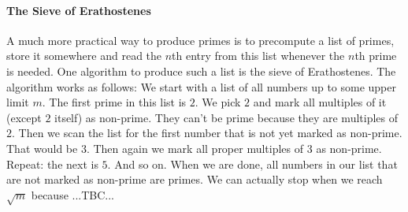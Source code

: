 


\paragraph{The Sieve of Erathostenes}
A much more practical way to produce primes is to precompute a list of primes, store it somewhere and read the $n$th entry from this list whenever the $n$th prime is needed. One algorithm to produce such a list is the sieve of Erathostenes. The algorithm works as follows: We start with a list of all numbers up to some upper limit $m$. The first prime in this list is $2$. We pick $2$ and mark all multiples of it (except $2$ itself) as non-prime. They can't be prime because they are multiples of $2$. Then we scan the list for the first number that is not yet marked as non-prime. That would be $3$. Then again we  mark all proper multiples of $3$ as non-prime. Repeat: the next is $5$. And so on. When we are done, all numbers in our list that are not marked as non-prime are primes. We can actually stop when we reach $\sqrt{m}$ because ...TBC...



